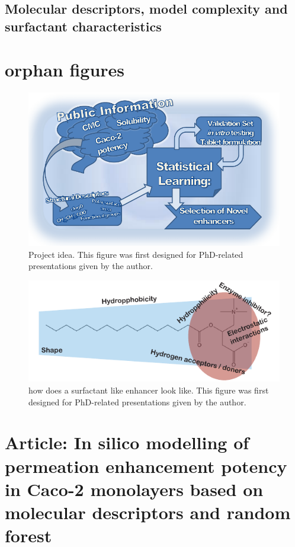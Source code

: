 \subsection{Molecular descriptors, model complexity and surfactant characteristics}
\label{modelMolecules}

\section{orphan figures}


\begin{figure}[!htbp]
\includegraphics{graphics/workSummary_130mm.pdf}
\caption{Project idea. This figure was first designed for PhD-related presentations given by the author.}
\label{workSummary}
\end{figure}

\begin{figure}[!htpb]
\includegraphics{graphics/typeOfSurfactant.pdf}
\caption{how does a surfactant like enhancer look like. This figure was first designed for PhD-related presentations given by the author.}
\label{typeOfSurfactant}
\end{figure}

\section{Article: In silico modelling of permeation enhancement potency in Caco-2
monolayers based on molecular descriptors and random forest}
\label{article:predAbs}

\newpage




